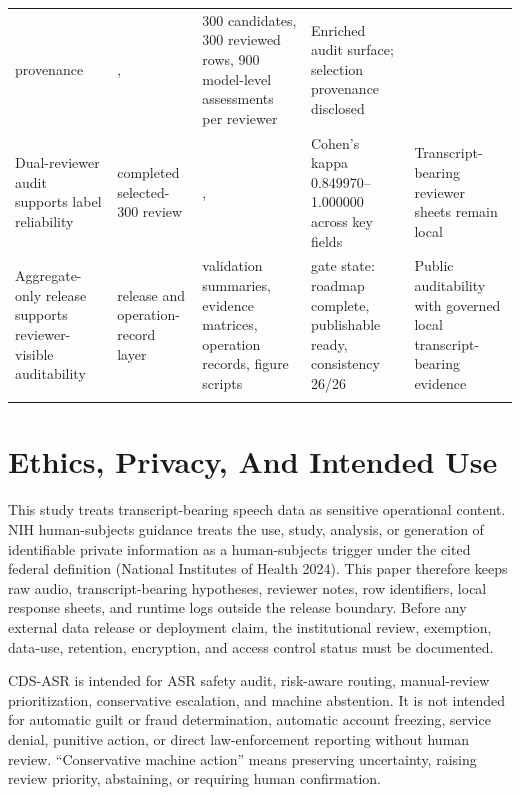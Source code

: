 \documentclass[
]{article}
\begin{document}
\begin{tabularx}{\linewidth}{@{}
  L{1.2000}
  L{1.0000}
  L{1.1000}
  L{0.8000}
  L{0.9000}@{}}
provenance & \texttt{},
\texttt{} & 300 candidates, 300 reviewed rows,
900 model-level assessments per reviewer & Enriched audit surface;
selection provenance disclosed \\
Dual-reviewer audit supports label reliability & completed selected-300
review & \texttt{},
\texttt{} & Cohen's kappa
0.849970--1.000000 across key fields & Transcript-bearing reviewer
sheets remain local \\
Aggregate-only release supports reviewer-visible auditability & release
and operation-record layer & validation summaries, evidence matrices,
operation records, figure scripts & gate state: roadmap complete,
publishable ready, consistency 26/26 & Public auditability with governed
local transcript-bearing evidence \\
\bottomrule\noalign{}
\end{tabularx}

\hypertarget{ethics-privacy-and-intended-use}{%
\section{Ethics, Privacy, And Intended
Use}\label{ethics-privacy-and-intended-use}}

This study treats transcript-bearing speech data as sensitive
operational content. NIH human-subjects guidance treats the use, study,
analysis, or generation of identifiable private information as a
human-subjects trigger under the cited federal definition (National
Institutes of Health 2024). This paper therefore keeps raw audio,
transcript-bearing hypotheses, reviewer notes, row identifiers, local
response sheets, and runtime logs outside the release boundary. Before
any external data release or deployment claim, the institutional review,
exemption, data-use, retention, encryption, and access control status
must be documented.

CDS-ASR is intended for ASR safety audit, risk-aware routing,
manual-review prioritization, conservative escalation, and machine
abstention. It is not intended for automatic guilt or fraud
determination, automatic account freezing, service denial, punitive
action, or direct law-enforcement reporting without human review.
``Conservative machine action'' means preserving uncertainty, raising
review priority, abstaining, or requiring human confirmation.
\end{document}
